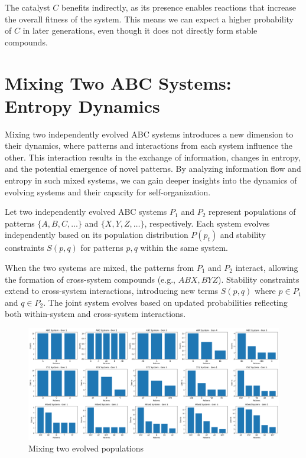 \documentclass[entropy,article,submit,pdftex,moreauthors]{Definitions/mdpi}
\begin{document}
The catalyst \( C \) benefits indirectly, as its presence enables reactions that increase the overall fitness of the system. This means we can expect a higher probability of \( C \) in later generations, even though it does not directly form stable compounds.

\section{Mixing Two ABC Systems: Entropy Dynamics}

Mixing two independently evolved ABC systems introduces a new dimension to their dynamics, where patterns and interactions from each system influence the other. This interaction results in the exchange of information, changes in entropy, and the potential emergence of novel patterns. By analyzing information flow and entropy in such mixed systems, we can gain deeper insights into the dynamics of evolving systems and their capacity for self-organization.

Let two independently evolved ABC systems \( P_1 \) and \( P_2 \) represent populations of patterns \( \{A, B, C, \dots\} \) and \( \{X, Y, Z, \dots\} \), respectively. Each system evolves independently based on its population distribution \( P(p_t) \) and stability constraints \( S(p, q) \) for patterns \( p, q \) within the same system.

When the two systems are mixed, the patterns from \( P_1 \) and \( P_2 \) interact, allowing the formation of cross-system compounds (e.g., \( ABX, BYZ \)). Stability constraints extend to cross-system interactions, introducing new terms \( S(p, q) \) where \( p \in P_1 \) and \( q \in P_2 \). The joint system evolves based on updated probabilities reflecting both within-system and cross-system interactions.

\begin{figure}[htp]
    \centering
    \includegraphics[width=13cm]{mixed_1}
    \caption{Mixing two evolved populations}
    \label{fig:mixed_1}
\end{figure}
\end{document}
